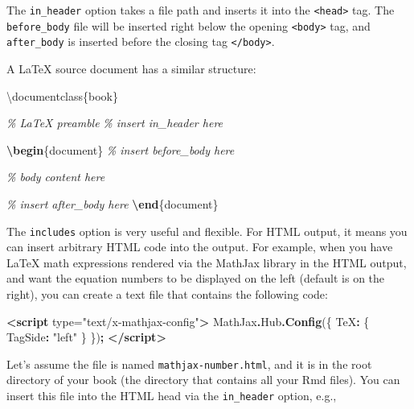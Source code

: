 \documentclass[
  12pt,
]{krantz}
\newenvironment{Shaded}{\begin{snugshade}}{\end{snugshade}}
\newcommand{\AttributeTok}[1]{\textcolor[rgb]{0.13,0.29,0.53}{#1}}
\newcommand{\BuiltInTok}[1]{#1}
\newcommand{\CommentTok}[1]{\textcolor[rgb]{0.56,0.35,0.01}{\textit{#1}}}
\newcommand{\DataTypeTok}[1]{\textcolor[rgb]{0.13,0.29,0.53}{#1}}
\newcommand{\ExtensionTok}[1]{#1}
\newcommand{\FunctionTok}[1]{\textcolor[rgb]{0.13,0.29,0.53}{\textbf{#1}}}
\newcommand{\KeywordTok}[1]{\textcolor[rgb]{0.13,0.29,0.53}{\textbf{#1}}}
\newcommand{\NormalTok}[1]{#1}
\newcommand{\OperatorTok}[1]{\textcolor[rgb]{0.81,0.36,0.00}{\textbf{#1}}}
\newcommand{\OtherTok}[1]{\textcolor[rgb]{0.56,0.35,0.01}{#1}}
\newcommand{\StringTok}[1]{\textcolor[rgb]{0.31,0.60,0.02}{#1}}
\begin{document}
The \texttt{in\_header} option takes a file path and inserts it into the \texttt{\textless{}head\textgreater{}} tag. The \texttt{before\_body} file will be inserted right below the opening \texttt{\textless{}body\textgreater{}} tag, and \texttt{after\_body} is inserted before the closing tag \texttt{\textless{}/body\textgreater{}}.

A LaTeX source document has a similar structure:

\begin{Shaded}
\begin{Highlighting}[]
\BuiltInTok{\textbackslash{}documentclass}\NormalTok{\{}\ExtensionTok{book}\NormalTok{\}}

\CommentTok{\% LaTeX preamble}
\CommentTok{\% insert in\_header here}

\KeywordTok{\textbackslash{}begin}\NormalTok{\{}\ExtensionTok{document}\NormalTok{\}}
\CommentTok{\% insert before\_body here}

\CommentTok{\% body content here}

\CommentTok{\% insert after\_body here}
\KeywordTok{\textbackslash{}end}\NormalTok{\{}\ExtensionTok{document}\NormalTok{\}}
\end{Highlighting}
\end{Shaded}

The \texttt{includes} option is very useful and flexible. For HTML output, it means you can insert arbitrary HTML code into the output. For example, when you have LaTeX math expressions rendered via the MathJax library in the HTML output, and want the equation numbers to be displayed on the left (default is on the right), you can create a text file that contains the following code:

\begin{Shaded}
\begin{Highlighting}[]
\KeywordTok{\textless{}script}\OtherTok{ type=}\StringTok{"text/x{-}mathjax{-}config"}\KeywordTok{\textgreater{}}
\NormalTok{MathJax}\OperatorTok{.}\AttributeTok{Hub}\OperatorTok{.}\FunctionTok{Config}\NormalTok{(\{}
  \DataTypeTok{TeX}\OperatorTok{:}\NormalTok{ \{ }\DataTypeTok{TagSide}\OperatorTok{:} \StringTok{"left"}\NormalTok{ \}}
\NormalTok{\})}\OperatorTok{;}
\KeywordTok{\textless{}/script\textgreater{}}
\end{Highlighting}
\end{Shaded}

Let's assume the file is named \texttt{mathjax-number.html}, and it is in the root directory of your book (the directory that contains all your Rmd files). You can insert this file into the HTML head via the \texttt{in\_header} option, e.g.,
\end{document}

